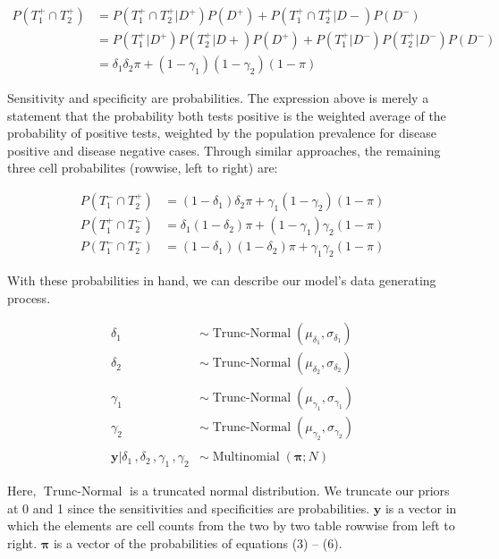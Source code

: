 \documentclass[10pt,a4paper]{article}
\begin{document}
	\begin{align}
	 P( T_1^+ \cap T_2^+) &= P( T_1^+ \cap T_2^+ \vert D^+)P(D^+) + P( T_1^+ \cap T_2^+\vert D-)P(D^-)  \\
	 &= P(T_1^+\vert D^+)P(T_2^+\vert D+)P(D^+) + P(T_1^+\vert D^-)P(T_2^+\vert D^-)P(D^-) \\ 
	 &= \delta_1 \delta_2 \pi + (1-\gamma_1)(1-\gamma_2)(1-\pi)
	\end{align}	
	
	
	\noindent Sensitivity and specificity are  probabilities.  The expression above is merely a statement that the probability both tests positive is the weighted average of the probability of positive tests, weighted by the population prevalence for disease positive and disease negative cases.  Through similar approaches, the remaining three cell probabilites (rowwise, left to right) are:
	
	\begin{align}
	 P( T_1^- \cap T_2^+) &= (1-\delta_1)\delta_2\pi + \gamma_1(1-\gamma_2)(1-\pi)\\
	  P( T_1^+ \cap T_2^-) &= \delta_1(1-\delta_2)\pi + (1-\gamma_1)\gamma_2(1-\pi)\\
	   P( T_1^- \cap T_2^-) &= (1-\delta_1)(1-\delta_2)\pi + \gamma_1\gamma_2(1-\pi)
	\end{align}
	
	\noindent With these probabilities in hand, we can describe our model's data generating process. 
	
	\begin{align*}
	\delta_1 &\sim \operatorname{Trunc-Normal}(\mu_{\delta_1}, \sigma_{\delta_1}) \\
	\delta_2 &\sim \operatorname{Trunc-Normal}(\mu_{\delta_2}, \sigma_{\delta_2}) \\\\
	\gamma_1 &\sim \operatorname{Trunc-Normal}(\mu_{\gamma_1}, \sigma_{\gamma_1}) \\
	\gamma_2 &\sim \operatorname{Trunc-Normal}(\mu_{\gamma_2}, \sigma_{\gamma_2}) \\\\
	\mathbf{y}\vert \delta_1 \,, \delta_2 \,, \gamma_1 \,, \gamma_2 &\sim \operatorname{Multinomial}(\bm{\pi}; N)
	\end{align*}
	
	Here, $ \operatorname{Trunc-Normal} $ is a truncated normal distribution.  We truncate our priors at 0 and 1 since the sensitivities and specificities are probabilities.  $ \mathbf{y} $ is a vector in which the elements are cell counts from the two by two table rowwise from left to right.  $ \bm{\pi} $ is a vector of the probabilities of equations (3) -- (6).
	
\end{document}
